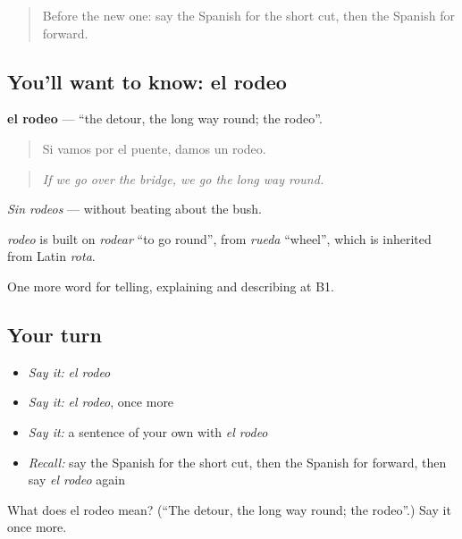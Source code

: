 \label{lesson:ES-C671-rodeo}



\begin{quote}
Before the new one: say the Spanish for the short cut, then the Spanish for forward.
\end{quote}

\subsection*{You'll want to know: el rodeo}
\textbf{el rodeo} — \textquotedblleft{}the detour, the long way round; the rodeo\textquotedblright{}.

\begin{quote}
Si vamos por el puente, damos un rodeo.
\end{quote}

\begin{quote}
\emph{If we go over the bridge, we go the long way round.}
\end{quote}

\emph{Sin rodeos} — without beating about the bush.

\begin{cousinweb}
\emph{rodeo} is built on \emph{rodear} \textquotedblleft{}to go round\textquotedblright{}, from \emph{rueda} \textquotedblleft{}wheel\textquotedblright{}, which is inherited from Latin \emph{rota}.
\end{cousinweb}

\begin{grammarlens}[title={What you've built}]
One more word for telling, explaining and describing at B1.
\end{grammarlens}

\subsection*{Your turn}
\begin{itemize}
\raggedright
  \item \emph{Say it:} \emph{el rodeo}
  \item \emph{Say it:} \emph{el rodeo}, once more
  \item \emph{Say it:} a sentence of your own with \emph{el rodeo}
  \item \emph{Recall:} say the Spanish for the short cut, then the Spanish for forward, then say \emph{el rodeo} again
\end{itemize}

\begin{tcolorbox}[breakable,colback=teal!4,colframe=teal!35!black,title={Before you move on}]
What does el rodeo mean? (\textquotedblleft{}The detour, the long way round; the rodeo\textquotedblright{}.) Say it once more.
\end{tcolorbox}
